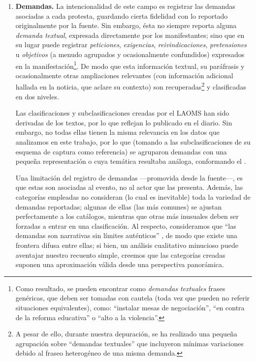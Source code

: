 \documentclass[letterpaper, 11pt]{book}
\theoremstyle{definition}
\theoremstyle{remark}
\begin{document}
\begin{enumerate}
    \item \textbf{Demandas.} 
    La intencionalidad de este campo es registrar las demandas asociadas a cada protesta, guardando cierta fidelidad con lo reportado originalmente por la fuente. 
    Sin embargo, ésta no siempre reporta alguna \emph{demanda textual}, expresada directamente por los manifestantes; sino que en su lugar puede registrar \emph{peticiones}, \emph{exigencias}, \emph{reivindicaciones}, \emph{pretensiones} u \emph{objetivos} (a menudo agrupados y ocasionalmente confundidos) expresados en la manifestación\footnote{
	Como resultado, se pueden encontrar como \emph{demandas textuales} frases genéricas, que deben ser tomadas con cautela (toda vez que pueden no referir situaciones equivalentes), como: ``instalar mesas de negociación'', ``en contra de la reforma educativa'' o ``alto a la violencia''. 
    }. 
    De modo que esta información textual, su paráfrasis y ocasionalmente otras ampliaciones relevantes (con información adicional hallada en la noticia, que aclare su contexto) son recuperadas\footnote{
	A pesar de ello, durante nuestra depuración, se ha realizado una pequeña agrupación sobre ``demandas textuales'' que incluyeron mínimas variaciones debido al fraseo heterogéneo de una misma demanda.
    } y clasificadas en dos niveles. 
    
    Las clasificaciones y subclasificaciones creadas por el LAOMS han sido derivadas de los textos, por lo que reflejan lo publicado en el diario. 
    Sin embargo, no todas ellas tienen la misma relevancia en los datos que analizamos en este trabajo, por lo que (tomando a las subclasificaciones de su esquema de captura como referencia) se agruparon demandas con una pequeña representación o cuya temática resultaba análoga, conformando el . 
    
    Una limitación del registro de demandas ---promovida desde la fuente---, es que estas son asociadas al evento, no al actor que las presenta. 
    Además, las categorías empleadas no consideran (lo cual es inevitable) toda la variedad de demandas reportadas; algunas de ellas (las más comunes) se ajustan perfectamente a los catálogos, mientras que otras más inusuales deben ser forzadas a entrar en una clasificación. 
    Al respecto, consideramos que ``las demandas son narrativas sin límites auténticos'' \citep[186]{2003_Wada_Tesis}, de modo que existe una frontera difusa entre ellas; si bien, un análisis cualitativo minucioso puede aventajar nuestro recuento simple, creemos que las categorías creadas suponen una aproximación válida desde una perspectiva panorámica. 


\end{enumerate}
\end{document}
